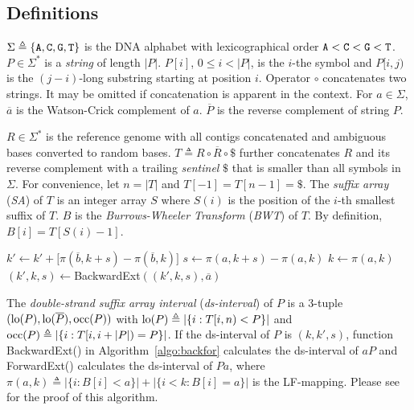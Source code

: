 \documentclass[webpdf,contemporary,large,namedate]{oup-authoring-template}%
\begin{document}
\subsection{Definitions}

$\Sigma\triangleq\{{\tt A},{\tt C},{\tt G},{\tt T}\}$ is the DNA alphabet
with lexicographical order ${\tt A}<{\tt C}<{\tt G}<{\tt T}$.
$P\in\Sigma^*$ is a \emph{string} of length $|P|$.
$P[i]$, $0\le i<|P|$, is the $i$-the symbol and
$P[i,j)$ is the $(j-i)$-long substring starting at position $i$.
Operator $\circ$ concatenates two strings.
It may be omitted if concatenation is apparent in the context.
For $a\in\Sigma$, $\overline{a}$ is the Watson-Crick complement of $a$.
$\overline{P}$ is the reverse complement of string $P$.

$R\in\Sigma^*$ is the reference genome with all contigs concatenated and ambiguous bases converted to random bases.
$T\triangleq R\circ\overline{R}\circ\$$ further concatenates $R$ and its reverse complement
with a trailing \emph{sentinel} $\$$ that is smaller than all symbols in $\Sigma$.
For convenience, let $n=|T|$ and $T[-1]=T[n-1]=\$$.
The \emph{suffix array} (\emph{SA}) of $T$ is an integer array $S$ where
$S(i)$ is the position of the $i$-th smallest suffix of $T$.
$B$ is the \emph{Burrows-Wheeler Transform} (\emph{BWT}) of $T$.
By definition, $B[i]=T[S(i)-1]$.

\begin{algorithm}[tb]
	\caption{Backward and forward extension}\label{algo:backfor}
	\begin{algorithmic}[1]
				\State $k'\gets k'+\big[\pi(\overline{b},k+s)-\pi(\overline{b},k)\big]$
			\EndFor
			\State $s\gets \pi(a,k+s)-\pi(a,k)$
			\State $k\gets \pi(a,k)$
			\State {}
		\EndFunction
			\State $(k',k,s)\gets${\sc BackwardExt}$((k',k,s),\overline{a})$
			\State {}
		\EndFunction
	\end{algorithmic}
\end{algorithm}

The \emph{double-strand suffix array interval} (\emph{ds-interval}) of $P$
is a 3-tuple $({\rm lo}(P),{\rm lo}(\overline{P}),{\rm occ}(P))$ with
${\rm lo}(P)\triangleq|\{i:T[i,n)<P\}|$ and ${\rm occ}(P)\triangleq|\{i:T[i,i+|P|)=P\}|$.
If the ds-interval of $P$ is $(k,k',s)$,
function {\sc BackwardExt()} in Algorithm~\ref{algo:backfor} calculates the ds-interval of $aP$
and {\sc ForwardExt()} calculates the ds-interval of $Pa$,
where $\pi(a,k)\triangleq |\{i:B[i]<a\}|+|\{i<k:B[i]=a\}|$ is the LF-mapping.
Please see \citet{Li:2024ac} for the proof of this algorithm.
\end{document}
